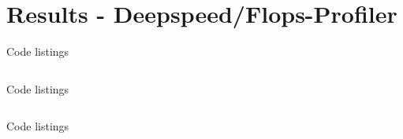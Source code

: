 \documentclass[compress,aspectratio=169]{beamer}
\begin{document}

\section{Results - Deepspeed/Flops-Profiler}

\begin{frame}[fragile]{Code listings}
        \footnotesize\inputminted[xleftmargin=1em,linenos,fontsize=\scriptsize, firstline=1,lastline=16]{python}{../../data/scap_gtx1080_deepspeed_14615344_4294967294_one-epoch.txt}

\end{frame}

\begin{frame}[fragile]{Code listings}
        \footnotesize\inputminted[xleftmargin=1em,linenos,fontsize=\scriptsize, firstline=18,lastline=31]{python}{../../data/scap_gtx1080_deepspeed_14615344_4294967294_one-epoch.txt}

\end{frame}

\begin{frame}[fragile]{Code listings}
        \footnotesize\inputminted[xleftmargin=1em,linenos,fontsize=\tiny, firstline=33,lastline=48, breaklines]{python}{../../data/scap_gtx1080_deepspeed_14615344_4294967294_one-epoch.txt}

\end{frame}
\end{document}
